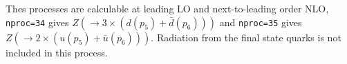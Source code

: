 Thes processes are calculable at leading LO and next-to-leading order NLO,
{\tt nproc=34} gives $ Z(\to 3\times(d(p_5)+\bar{d}(p_6)))$
and {\tt nproc=35} gives$ Z(\to 2\times(u(p_5)+\bar{u}(p_6)))$.
Radiation from the final state quarks is not included in this process.
